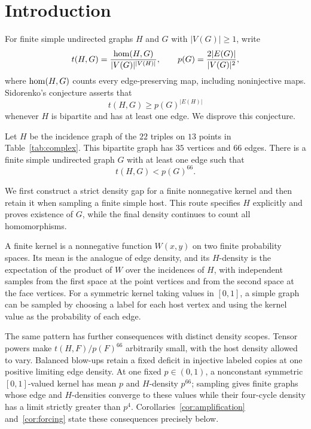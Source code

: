 \section{Introduction}\label{sec:introduction}

For finite simple undirected graphs \(H\) and \(G\) with
\(|V(G)|\ge1\), write
\[
t(H,G)=\frac{\operatorname{hom}(H,G)}{|V(G)|^{|V(H)|}},
\qquad
p(G)=\frac{2|E(G)|}{|V(G)|^2},
\]
where \(\operatorname{hom}(H,G)\) counts every edge-preserving map, including
noninjective maps. Sidorenko's conjecture asserts that
\begin{equation}\label{eq:sidorenko}
t(H,G)\ge p(G)^{|E(H)|}
\end{equation}
whenever \(H\) is bipartite and has at least one edge.
We disprove this conjecture.

\begin{theorem}\label{thm:main}
Let \(H\) be the incidence graph of the \(22\) triples on \(13\) points
in Table~\ref{tab:complex}. This bipartite graph has \(35\) vertices
and \(66\) edges. There is a finite simple undirected graph \(G\)
with at least one edge such that
\[
t(H,G)<p(G)^{66}.
\]
\end{theorem}

We first construct a strict density gap for a finite nonnegative
kernel and then retain it when sampling a finite simple host. This
route specifies \(H\) explicitly and proves existence of \(G\), while
the final density continues to count all homomorphisms.

A finite kernel is a nonnegative function \(W(x,y)\) on two finite
probability spaces. Its mean is the analogue of edge density, and its
\(H\)-density is the expectation of the product of \(W\) over the
incidences of \(H\), with independent samples from the first space at
the point vertices and from the second space at the face vertices.
For a symmetric kernel taking values in \([0,1]\), a simple graph
can be sampled by choosing a label for each host vertex and using the
kernel value as the probability of each edge.

The same pattern has further consequences with distinct density
scopes. Tensor powers make \(t(H,F)/p(F)^{66}\) arbitrarily small,
with the host density allowed to vary. Balanced blow-ups retain a
fixed deficit in injective labeled copies at one positive limiting
edge density. At one fixed \(p\in(0,1)\), a nonconstant symmetric
\([0,1]\)-valued kernel has mean \(p\) and \(H\)-density \(p^{66}\);
sampling gives finite graphs whose edge and \(H\)-densities converge
to these values while their four-cycle density has a limit strictly
greater than \(p^4\).
Corollaries~\ref{cor:amplification} and~\ref{cor:forcing} state these
consequences precisely below.

